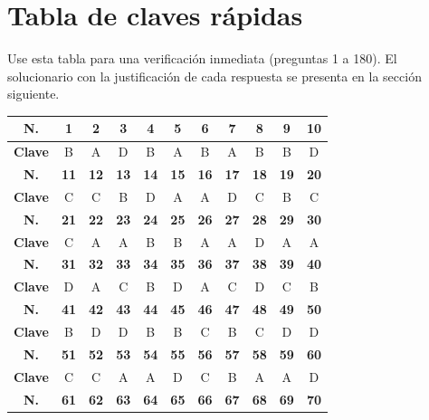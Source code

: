 \newpage
\section*{Tabla de claves rápidas}

\noindent Use esta tabla para una verificación inmediata (preguntas 1 a 180). El solucionario con la justificación de cada respuesta se presenta en la sección siguiente.

\vspace{0.35cm}
\begin{center}
\footnotesize
\renewcommand{\arraystretch}{1.25}
\begin{tabular}{|c|c|c|c|c|c|c|c|c|c|c|}
\hline
\textbf{N.} & \textbf{1} & \textbf{2} & \textbf{3} & \textbf{4} & \textbf{5} & \textbf{6} & \textbf{7} & \textbf{8} & \textbf{9} & \textbf{10} \\
\hline
\textbf{Clave} & B & A & D & B & A & B & A & B & B & D \\
\hline
\textbf{N.} & \textbf{11} & \textbf{12} & \textbf{13} & \textbf{14} & \textbf{15} & \textbf{16} & \textbf{17} & \textbf{18} & \textbf{19} & \textbf{20} \\
\hline
\textbf{Clave} & C & C & B & D & A & A & D & C & B & C \\
\hline
\textbf{N.} & \textbf{21} & \textbf{22} & \textbf{23} & \textbf{24} & \textbf{25} & \textbf{26} & \textbf{27} & \textbf{28} & \textbf{29} & \textbf{30} \\
\hline
\textbf{Clave} & C & A & A & B & B & A & A & D & A & A \\
\hline
\textbf{N.} & \textbf{31} & \textbf{32} & \textbf{33} & \textbf{34} & \textbf{35} & \textbf{36} & \textbf{37} & \textbf{38} & \textbf{39} & \textbf{40} \\
\hline
\textbf{Clave} & D & A & C & B & D & A & C & D & C & B \\
\hline
\textbf{N.} & \textbf{41} & \textbf{42} & \textbf{43} & \textbf{44} & \textbf{45} & \textbf{46} & \textbf{47} & \textbf{48} & \textbf{49} & \textbf{50} \\
\hline
\textbf{Clave} & B & D & D & B & B & C & B & C & D & D \\
\hline
\textbf{N.} & \textbf{51} & \textbf{52} & \textbf{53} & \textbf{54} & \textbf{55} & \textbf{56} & \textbf{57} & \textbf{58} & \textbf{59} & \textbf{60} \\
\hline
\textbf{Clave} & C & C & A & A & D & C & B & A & A & D \\
\hline
\textbf{N.} & \textbf{61} & \textbf{62} & \textbf{63} & \textbf{64} & \textbf{65} & \textbf{66} & \textbf{67} & \textbf{68} & \textbf{69} & \textbf{70} \\

\end{tabular}
\end{center}
